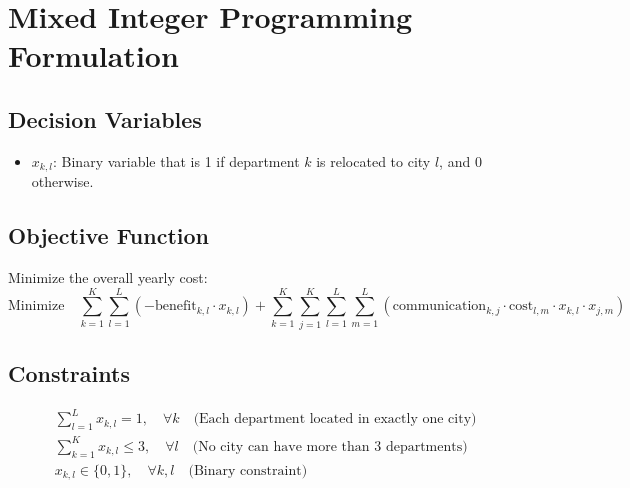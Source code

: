 \documentclass{article}
\begin{document}
\section*{Mixed Integer Programming Formulation}

\subsection*{Decision Variables}
\begin{itemize}
    \item \( x_{k,l} \): Binary variable that is 1 if department \( k \) is relocated to city \( l \), and 0 otherwise.
\end{itemize}

\subsection*{Objective Function}
Minimize the overall yearly cost:
\[
\text{Minimize} \quad \sum_{k=1}^{K} \sum_{l=1}^{L} (-\text{benefit}_{k,l} \cdot x_{k,l}) + \sum_{k=1}^{K} \sum_{j=1}^{K} \sum_{l=1}^{L} \sum_{m=1}^{L} (\text{communication}_{k,j} \cdot \text{cost}_{l,m} \cdot x_{k,l} \cdot x_{j,m})
\]

\subsection*{Constraints}
\begin{align*}
    &\sum_{l=1}^{L} x_{k,l} = 1, \quad \forall k \quad \text{(Each department located in exactly one city)} \\
    &\sum_{k=1}^{K} x_{k,l} \leq 3, \quad \forall l \quad \text{(No city can have more than 3 departments)} \\
    &x_{k,l} \in \{0, 1\}, \quad \forall k, l \quad \text{(Binary constraint)}
\end{align*}
\end{document}
